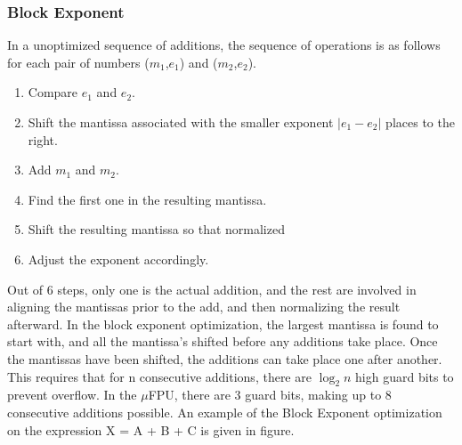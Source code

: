 \subsubsection{Block Exponent}

In a unoptimized sequence of additions, the sequence of operations is as
follows for each pair of numbers ($m_1$,$e_1$) and ($m_2$,$e_2$).
\begin{enumerate}
  \item Compare $e_1$ and $e_2$.
  \item Shift the mantissa associated with the smaller exponent $|e_1-e_2|$
        places to the right.
  \item Add $m_1$ and $m_2$.
  \item Find the first one in the resulting mantissa.
  \item Shift the resulting mantissa so that normalized
  \item Adjust the exponent accordingly.
\end{enumerate}

Out of 6 steps, only one is the actual addition, and the rest are involved
in aligning the mantissas prior to the add, and then normalizing the result
afterward.  In the block exponent optimization, the largest mantissa is
found to start with, and all the mantissa's shifted before any additions
take place.  Once the mantissas have been shifted, the additions can take
place one after another. This requires that for n consecutive
additions, there are $\log_{2}n$ high guard bits to prevent overflow.  In
the $\mu$FPU, there are 3 guard bits, making up to 8 consecutive additions
possible. An example of the Block Exponent optimization on the expression
X = A + B + C is given in figure.






